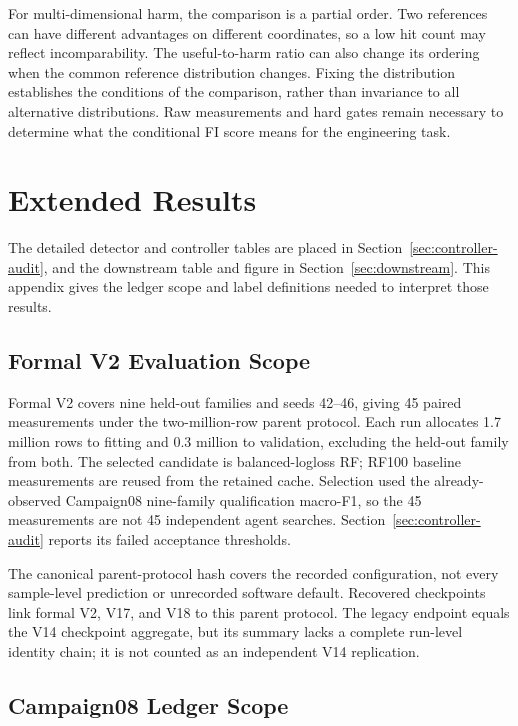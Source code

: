 \documentclass[manuscript,screen,nonacm]{acmart}
\begin{document}
For multi-dimensional harm, the comparison is a partial order. Two references can have different advantages on different coordinates, so a low hit count may reflect incomparability. The useful-to-harm ratio can also change its ordering when the common reference distribution changes. Fixing the distribution establishes the conditions of the comparison, rather than invariance to all alternative distributions. Raw measurements and hard gates remain necessary to determine what the conditional FI score means for the engineering task.

\section{Extended Results}
\label{app:extended-results}

The detailed detector and controller tables are placed in Section~\ref{sec:controller-audit}, and the downstream table and figure in Section~\ref{sec:downstream}. This appendix gives the ledger scope and label definitions needed to interpret those results.

\subsection{Formal V2 Evaluation Scope}

Formal V2 covers nine held-out families and seeds 42--46, giving 45 paired
measurements under the two-million-row parent protocol. Each run allocates
1.7 million rows to fitting and 0.3 million to validation, excluding the
held-out family from both. The selected candidate is balanced-logloss RF;
RF100 baseline measurements are reused from the retained cache. Selection
used the already-observed Campaign08 nine-family qualification macro-F1,
so the 45 measurements are not 45 independent agent searches.
Section~\ref{sec:controller-audit} reports its failed acceptance thresholds.

The canonical parent-protocol hash covers the recorded configuration, not
every sample-level prediction or unrecorded software default. Recovered
checkpoints link formal V2, V17, and V18 to this parent protocol. The legacy
endpoint equals the V14 checkpoint aggregate, but its summary lacks a complete
run-level identity chain; it is not counted as an independent V14 replication.

\subsection{Campaign08 Ledger Scope}
\end{document}
